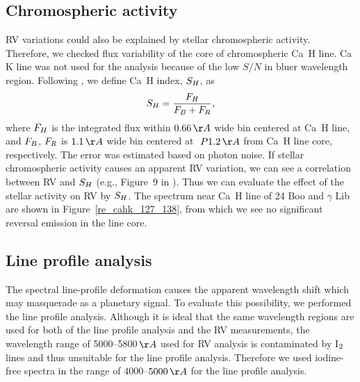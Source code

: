 \documentclass[]{pasj01}
\begin{document}
\subsection{Chromospheric activity}
RV variations could also be explained by stellar chromospheric activity.
Therefore, we checked flux variability of the core of chromospheric Ca\, H line.
Ca\, K line was not used for the analysis because of the low $S/N$ in bluer wavelength region.
Following \citet{Sato2013a}, we define Ca\, H index, $S_{\rm{H}}$, as
\begin{equation}
S_{\rm{H}}=\frac{F_{\rm{H}}}{F_{\rm{B}}+F_{\rm{R}}},
\end{equation}
where $F_{\rm H}$ is the integrated flux within $0.66\,{\rm \AA}$ wide bin centered at Ca\, H line, and $F_{\rm B}$, $F_{\rm R}$ is $1.1\,{\rm \AA}$ wide bin centered at $\pm1.2\,{\rm \AA}$ from Ca\, H line core, respectively.
The error was estimated based on photon noise.
If stellar chromospheric activity causes an apparent RV variation, we can see a correlation between RV and $S_{\rm{H}}$ (e.g., Figure~9 in \cite{Sato2013a}).
Thus we can evaluate the effect of the stellar activity on RV by $S_{\rm{H}}$.
The spectrum near Ca\, H line of 24 Boo and $\gamma$ Lib are shown in Figure~\ref{re_cahk_127_138}, from which we see no significant reversal emission in the line core.
\subsection{Line profile analysis}
\label{sec:BIS}
The spectral line-profile deformation causes the apparent wavelength shift which may masquerade as a planetary signal.
To evaluate this possibility, we performed the line profile analysis.
Although it is ideal that the same wavelength regions are used for both of the line profile analysis and the RV measurements, the wavelength range of 5000--5800$\,{\rm \AA}$ used for RV analysis is contaminated by I$_{\rm 2}$ lines and thus unsuitable for the line profile analysis. 
Therefore we used iodine-free spectra in the range of $4000$--$5000\,{\rm \AA}$ for the line profile analysis.
\end{document}

